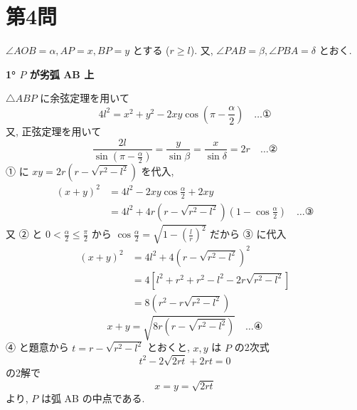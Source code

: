 \documentclass[../main.tex]{subfiles}
\begin{document}
\newpage

\section*{第4問}

\noindent
[\textbf{解}] $\angle AOB = \alpha, AP = x, BP = y$ とする ($r \ge l$). 又, $\angle PAB = \beta, \angle PBA = \delta$ とおく.

\bigskip

\noindent
\textbf{1° $P$ が劣弧 AB 上}

\begin{center}
\end{center}

\noindent
$\triangle ABP$ に余弦定理を用いて
\[
  4l^2 = x^2 + y^2 - 2xy \cos\left(\pi - \frac{\alpha}{2}\right) \quad \dots \text{①}
\]
又, 正弦定理を用いて
\[
  \frac{2l}{\sin\left(\pi - \frac{\alpha}{2}\right)} = \frac{y}{\sin\beta} = \frac{x}{\sin\delta} = 2r \quad \dots \text{②}
\]
① に $xy = 2r\left(r - \sqrt{r^2 - l^2}\right)$ を代入,
\begin{align*}
  (x+y)^2 &= 4l^2 - 2xy \cos\frac{\alpha}{2} + 2xy \\
  &= 4l^2 + 4r\left(r - \sqrt{r^2 - l^2}\right)\left(1 - \cos\frac{\alpha}{2}\right) \quad \dots \text{③}
\end{align*}
又 ② と $0 < \frac{\alpha}{2} \le \frac{\pi}{2}$ から $\cos\frac{\alpha}{2} = \sqrt{1 - \left(\frac{l}{r}\right)^2}$ だから ③ に代入
\begin{align*}
  (x+y)^2 &= 4l^2 + 4\left(r - \sqrt{r^2 - l^2}\right)^2 \\
  &= 4\left[ l^2 + r^2 + r^2 - l^2 - 2r\sqrt{r^2 - l^2} \right] \\
  &= 8\left(r^2 - r\sqrt{r^2 - l^2}\right)
\end{align*}
\[
  x+y = \sqrt{8r\left(r - \sqrt{r^2 - l^2}\right)} \quad \dots \text{④}
\]
④ と題意から $t = r - \sqrt{r^2 - l^2}$ とおくと, $x, y$ は $P$ の2次式
\[
  t^2 - 2\sqrt{2rt} + 2rt = 0
\]
の2解で
\[
  x = y = \sqrt{2rt}
\]
より, $P$ は弧 AB の中点である.
\end{document}
